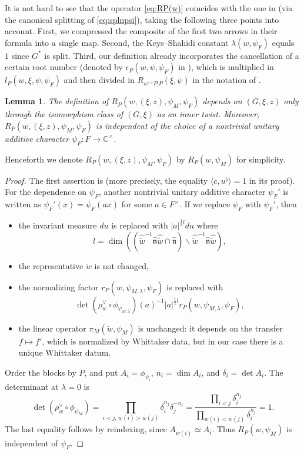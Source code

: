 \documentclass[11pt,reqno]{amsart}
\theoremstyle{plain}
\newtheorem{lem}[thm]{Lemma}
\theoremstyle{definition}
\newcommand{\C}{\mathbb{C}}
\renewcommand{\hat}{\widehat}
\numberwithin{equation}{subsection}
\begin{document}
It is not hard to see that the operator \eqref{eq:RP(w)} coincides with the one in \cite[(2.5.1)]{KMSW} (via the canonical splitting of \eqref{eq:splnpsi}), taking the following three points into account. First, we compressed the composite of the first two arrows in their formula into a single map. Second, the Keys--Shahidi constant $\lambda(w,\psi_F)$ equals $1$ since $G^*$ is split. Third, our definition already incorporates the cancellation of a certain root number (denoted by $\epsilon_P(w,\psi,\psi_F)$ in \cite[(2.3.1)]{KMSW}), which is multiplied in $l_P(w,\xi,\psi,\psi_F)$ and then divided in $R_{w^{-1}P|P}(\xi,\psi)$ in the notation of \cite[(2.5.1)]{KMSW}. 


\begin{lem}\label{lem:independent}
The definition of $R_P(w,(\xi,z),\psi_{M}, \psi_F)$ depends on $(G,\xi,z)$ only through the isomorphism class of $(G,\xi)$ as an inner twist.
Moreover, $R_P(w,(\xi,z),\psi_{M}, \psi_F)$ is independent of the choice of a nontrivial unitary additive character $\psi_F \colon F \rightarrow \C^\times$.
\end{lem}

Henceforth we denote $R_P(w,(\xi,z),\psi_{M}, \psi_F)$ by $R_P(w, \psi_M)$ for simplicity.

\begin{proof}
The first assertion is \cite[Lem.~2.6.4]{KMSW} (more precisely, the equality $\langle c,u^\natural\rangle=1$  in its proof).
For the dependence on $\psi_F$, 
another nontrivial unitary additive character $\psi_F'$ is written as 
$\psi_F'(x) = \psi_F(ax)$ for some $a \in F^\times$.
If we replace $\psi_F$ with $\psi_F'$, 
then 
\begin{itemize}
    \item the invariant measure $du$ is replaced with 
    $|a|^{\frac{1}{2}l}du$
    where 
    \[l = \dim((\widehat{\tilde w}^{-1}\hat{\mathfrak{n}}\widehat{\tilde w}\cap \hat{\mathfrak{n}})\backslash \widehat{\tilde w}^{-1}\hat{\mathfrak{n}}\widehat{\tilde w}),\]
    \item the representative $\breve{w}$ is not changed, 
    \item the normalizing factor $r_P(w,\psi_{M,\lambda},\psi_F)$
    is replaced with 
    \[
    \det(\rho_w^\vee \circ \phi_{\psi_{M,\lambda}})(a)^{-1} |a|^{\frac{1}{2}l}r_P(w,\psi_{M,\lambda},\psi_F),
    \]
    \item the linear operator $\pi_M(\breve{w}, \psi_M)$ is unchanged: it depends on the transfer $f \mapsto f'$, which is normalized by Whittaker data, but in our case there is a unique Whittaker datum. 
\end{itemize}
Order the blocks by $P$, and put $A_i=\phi_{\psi_i}$, $n_i=\dim A_i$,
and $\delta_i=\det A_i$. The determinant at $\lambda=0$ is
\[
 \det(\rho_w^\vee\circ\phi_{\psi_M})
 =\prod_{i<j,\,w(i)>w(j)}\delta_i^{n_j}\delta_j^{-n_i}
 =\frac{\prod_{i<j}\delta_i^{n_j}}{\prod_{w(i)<w(j)}\delta_i^{n_j}}
 =1.
\]
The last equality follows by reindexing, since $A_{w(i)}\simeq A_i$.
Thus $R_P(w,\psi_M)$ is independent of $\psi_F$.
\end{proof}
\end{document}
